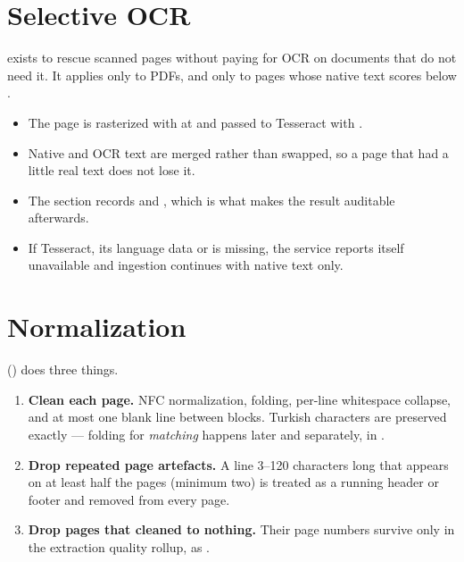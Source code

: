\section{Selective OCR}

 exists to rescue scanned pages without paying for OCR
on documents that do not need it. It applies only to PDFs, and only to pages
whose native text scores below .

\begin{itemize}
\item The page is rasterized with  at  and passed to
Tesseract with .
\item Native and OCR text are merged rather than swapped, so a page that had a
little real text does not lose it.
\item The section records  and
, which is what makes the result auditable afterwards.
\item If Tesseract, its language data or  is missing, the service
reports itself unavailable and ingestion continues with native text only.
\end{itemize}

\section{Normalization}

 () does three
things.

\begin{enumerate}
\item \textbf{Clean each page.} NFC normalization, 
folding, per-line whitespace collapse, and at most one blank line between
blocks. Turkish characters are preserved exactly --- folding for \emph{matching}
happens later and separately, in .

\item \textbf{Drop repeated page artefacts.} A line 3--120 characters long that
appears on at least half the pages (minimum two) is treated as a running header
or footer and removed from every page.

\item \textbf{Drop pages that cleaned to nothing.} Their page numbers survive
only in the extraction quality rollup, as .
\end{enumerate}

